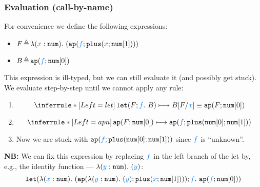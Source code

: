 \documentclass[11pt,landscape]{article}
\begin{document}
\subsubsection{Evaluation (call-by-name)} 

For convenience we define the following expressions:
\begin{itemize}
\item $F \defi {\clam{\enum{}}{x}{
        \eapp{\var f}{\eplus{\var{x}}{\enum{1}}}
      }
    }$
\item $B \defi  \eapp{\var{f}}{\enum{0}}$
\end{itemize}



This expression is ill-typed, but we can still evaluate it (and
possibly get stuck).
%
We evaluate step-by-step until we cannot apply any rule:

\begin{enumerate}
\item 
\[
\semrule{let}
{\,}
{
  \jtrans{\elet{F}{f}{B}}
  { \subs{B}{F}{x} \equiv  \eapp{F}{\enum{0}}}
}
\]
\item 
  \[
  \semrule{apn}
  {\,}
  {\jtrans
    {\eapp{F}{\enum{0}}}
    {
      {{
        \eapp{\var f}{\eplus{\enum{0}}{\enum{1}}}
      }
    }
    }
  }
  \]
\item Now we are stuck with ${
        \eapp{\var f}{\eplus{\enum{0}}{\enum{1}}}
      }$ since $\var{f}$ is ``unknown''.
\end{enumerate}



\textbf{NB:}
We can fix this expression by replacing $\var{f}$ in the left branch
of the let by, e.g., the identity function --- ${\clam{\enum{}}{y}{\var{y}}}$:
\[
{
  \elet{\clam{\enum{}}{x}{
      \eapp{\clam{\enum{}}{y}{\var{y}}}{\eplus{\var{x}}{\enum{1}}}
    }
  }{f}{
    \eapp{\var{f}}{\enum{0}}
  }
}
\]
\end{document}
